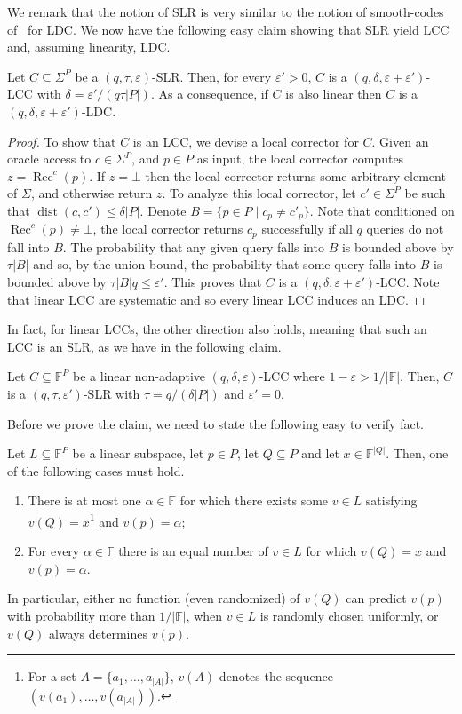 We remark that the notion of SLR is very similar to the notion of smooth-codes of~\cite{ref23} for LDC. We now have the following easy claim showing that SLR yield LCC and, assuming linearity, LDC.
\begin{ntclaim}
Let $C\subseteq\Sigma^P$ be a $(q,\tau,\varepsilon)$-SLR. Then, for every $\varepsilon'>0$, $C$ is a $(q,\delta,\varepsilon+\varepsilon')$-LCC with $\delta=\varepsilon'/(q\tau|P|)$. As a consequence, if $C$ is also linear then $C$ is a $(q,\delta,\varepsilon+\varepsilon')$-LDC.
\end{ntclaim}
\begin{proof}
To show that $C$ is an LCC, we devise a local corrector for $C$. Given an oracle access to $c\in\Sigma^P$, and $p\in P$ as input, the local corrector computes $z=\operatorname{Rec}^c(p)$. If $z=\bot$ then the local corrector returns some arbitrary element of $\Sigma$, and otherwise return $z$. To analyze this local corrector, let $c'\in\Sigma^P$ be such that $\operatorname{dist}(c,c')\leq\delta|P|$. Denote $B=\{p\in P\mid c_p\ne c'_p\}$. Note that conditioned on $\operatorname{Rec}^c(p)\ne\bot$, the local corrector returns $c_p$ successfully if all $q$ queries do not fall into $B$. The probability that any given query falls into $B$ is bounded above by $\tau|B|$ and so, by the union bound, the probability that some query falls into $B$ is bounded above by $\tau|B|q\leq\varepsilon'$. This proves that $C$ is a $(q,\delta,\varepsilon+\varepsilon')$-LCC. Note that linear LCC are systematic and so every linear LCC induces an LDC.
\end{proof}
In fact, for linear LCCs, the other direction also holds, meaning that such an LCC is an SLR, as we have in the following claim.
\begin{ntclaim}
Let $C\subseteq\mathbb F^P$ be a linear non-adaptive $(q,\delta,\varepsilon)$-LCC where $1-\varepsilon>1/|\mathbb F|$. Then, $C$ is a $(q,\tau,\varepsilon')$-SLR with $\tau=q/(\delta|P|)$ and $\varepsilon'=0$.
\end{ntclaim}
Before we prove the claim, we need to state the following easy to verify fact.
\begin{nttheorem}
Let $L\subseteq\mathbb F^P$ be a linear subspace, let $p\in P$, let $Q\subseteq P$ and let $x\in\mathbb F^{|Q|}$. Then, one of the following cases must hold.
\begin{enumerate}
\item There is at most one $\alpha\in\mathbb F$ for which there exists some $v\in L$ satisfying $v(Q)=x$\footnote{For a set $A=\{a_1,\ldots,a_{|A|}\}$, $v(A)$ denotes the sequence $(v(a_1),\ldots,v(a_{|A|}))$.} and $v(p)=\alpha$;
\item For every $\alpha\in\mathbb F$ there is an equal number of $v\in L$ for which $v(Q)=x$ and $v(p)=\alpha$.
\end{enumerate}
In particular, either no function (even randomized) of $v(Q)$ can predict $v(p)$ with probability more than $1/|\mathbb F|$, when $v\in L$ is randomly chosen uniformly, or $v(Q)$ always determines $v(p)$.
\end{nttheorem}
